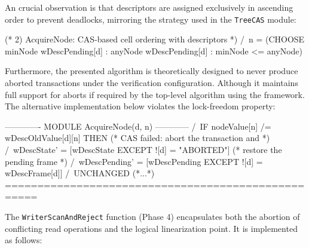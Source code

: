 An crucial observation is that descriptors are assigned exclusively in ascending order to prevent deadlocks, mirroring the strategy used in the \texttt{TreeCAS} module:

\begin{tla}
(* 2) AcquireNode: CAS-based cell ordering with descriptors *)
/\ n = (CHOOSE minNode \in wDescPending[d] :
    \A anyNode \in wDescPending[d] : minNode <= anyNode)
\end{tla}
\begin{tlatex}
\@x{}%
%
\@xx{}%
%
\end{tlatex}

Furthermore, the presented algorithm is theoretically designed to never produce aborted transactions under the verification configuration. Although it maintains full support for aborts if required by the top-level algorithm using the framework. The alternative implementation below violates the lock-freedom property:

\begin{tla}
------------- MODULE AcquireNode(d, n) ------------
/\ IF nodeValue[n] /= wDescOldValue[d][n]
THEN (* CAS failed: abort the transaction and *)
/\ wDescState' = [wDescState EXCEPT ![d] = "ABORTED"]
     (* restore the pending frame *)
/\ wDescPending' = [wDescPending EXCEPT ![d] = wDescFrame[d]]
/\ UNCHANGED (*...*)
===================================================
\end{tla}
\begin{tlatex}
 \@x{}\moduleLeftDash{}\moduleRightDash\@xx{}%
%
\@x{ \.{\THEN}}%
%
\@xx{}%
%
%
\@xx{}%
\@x{ \.{\land} {\UNCHANGED}}%
%
\@xx{}%
\@x{}\bottombar\@xx{}%
\end{tlatex}

The \texttt{WriterScanAndReject} function (Phase 4) encapsulates both the abortion of conflicting read operations and the logical linearization point. It is implemented as follows:

